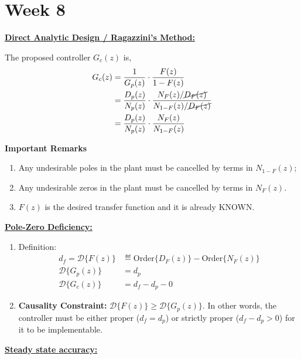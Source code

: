 \section{Week 8}
\textbf{\large \underline{Direct Analytic Design / Ragazzini's Method:}}
\vspace{0.25cm}

The proposed controller $G_c(z)$ is,
\begin{align*}
    G_c (z) &= \frac{1}{G_p(z)}\cdot \frac{F(z)}{1-F(z)} \\
    &= \frac{D_p(z)}{N_p(z)}\cdot \frac{N_F(z) / \cancel{D_F(z)}}{N_{1-F}(z)/\cancel{D_{F}(z)}} \\
    &= \frac{D_p(z)}{N_p(z)}\cdot \frac{N_F(z)}{N_{1-F}(z)}
\end{align*}

\textbf{Important Remarks}
\begin{enumerate}
    \item Any undesirable poles in the plant must be cancelled by terms in $N_{1-F}(z)$;
    \item Any undesirable zeros in the plant must be cancelled by terms in $N_F(z)$.
    \item $F(z)$ is the desired transfer function and it is already KNOWN.
\end{enumerate}

\textbf{\large \underline{Pole-Zero Deficiency:}}
\begin{enumerate}
    \item Definition:
    \begin{align*}
        d_f = \mathcal{D}\{F(z)\} &\eqdef  \text{Order}\{D_{F}(z)\} - \text{Order}\{N_{F}(z)\} \\
        \mathcal{D}\{G_p(z)\} &= d_p \\
        \mathcal{D}\{G_{c}(z)\} &= d_f - d_p - 0 
    \end{align*}
    \item \textbf{Causality Constraint:} $\mathcal{D}\{F(z)\} \geq \mathcal{D}\{G_p(z)\}$. In other words, the controller must be either proper ($d_f = d_p$) or strictly proper ($d_f -d_p >0$) for it to be implementable.
\end{enumerate}

\textbf{\large \underline{Steady state accuracy:}}
\vspace{0.25cm}

